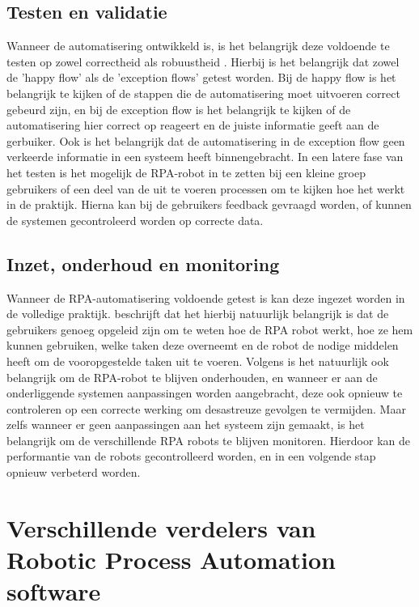\subsection{Testen en validatie}

Wanneer de automatisering ontwikkeld is, is het belangrijk deze voldoende te testen op zowel correctheid als robuustheid \autocite{Liu2023}. Hierbij is het belangrijk dat zowel de 'happy flow' als de 'exception flows' getest worden. Bij de happy flow is het belangrijk te kijken of de stappen die de automatisering moet uitvoeren correct gebeurd zijn, en bij de exception flow is het belangrijk te kijken of de automatisering hier correct op reageert en de juiste informatie geeft aan de gerbuiker. Ook is het belangrijk dat de automatisering in de exception flow geen verkeerde informatie in een systeem heeft binnengebracht.
In een latere fase van het testen is het mogelijk de RPA-robot in te zetten bij een kleine groep gebruikers of een deel van de uit te voeren processen om te kijken hoe het werkt in de praktijk. Hierna kan bij de gebruikers feedback gevraagd worden, of kunnen de systemen gecontroleerd worden op correcte data.

\subsection{Inzet, onderhoud en monitoring}

Wanneer de RPA-automatisering voldoende getest is kan deze ingezet worden in de volledige praktijk. \textcite{Lievanomartinez2022} beschrijft dat het hierbij natuurlijk belangrijk is dat de gebruikers genoeg opgeleid zijn om te weten hoe de RPA robot werkt, hoe ze hem kunnen gebruiken, welke taken deze overneemt en de robot de nodige middelen heeft om de vooropgestelde taken uit te voeren. Volgens \textcite{vanDerAalst2018} is het natuurlijk ook belangrijk om de RPA-robot te blijven onderhouden, en wanneer er aan de onderliggende systemen aanpassingen worden aangebracht, deze ook opnieuw te controleren op een correcte werking om desastreuze gevolgen te vermijden.
Maar zelfs wanneer er geen aanpassingen aan het systeem zijn gemaakt, is het belangrijk om de verschillende RPA robots te blijven monitoren. Hierdoor kan de performantie van de robots gecontrolleerd worden, en in een volgende stap opnieuw verbeterd worden.

\section{Verschillende verdelers van Robotic Process Automation software}


